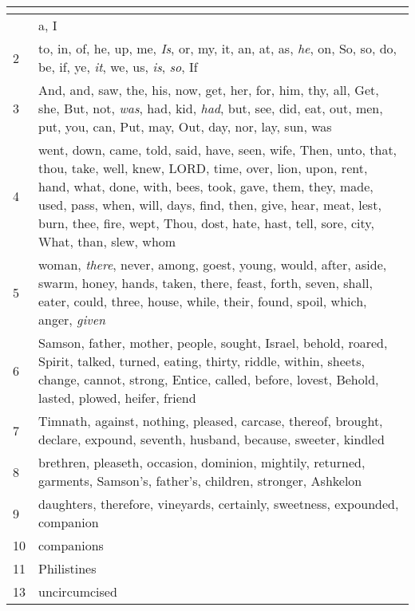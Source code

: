 \begin{center}
\begin{longtable}{l|p{3.75in}}
\hline \multicolumn{2}{c}{{ }} \\ \hline
\endfoot 
1 & a, I\\ \hline 
2 & to, in, of, he, up, me, \emph{Is}, or, my, it, an, at, as, \emph{he}, on, So, so, do, be, if, ye, \emph{it}, we, us, \emph{is}, \emph{so}, If\\ \hline 
3 & And, and, saw, the, his, now, get, her, for, him, thy, all, Get, she, But, not, \emph{was}, had, kid, \emph{had}, but, see, did, eat, out, men, put, you, can, Put, may, Out, day, nor, lay, sun, was\\ \hline 
4 & went, down, came, told, said, have, seen, wife, Then, unto, that, thou, take, well, knew, LORD, time, over, lion, upon, rent, hand, what, done, with, bees, took, gave, them, they, made, used, pass, when, will, days, find, then, give, hear, meat, lest, burn, thee, fire, wept, Thou, dost, hate, hast, tell, sore, city, What, than, slew, whom\\ \hline 
5 & woman, \emph{there}, never, among, goest, young, would, after, aside, swarm, honey, hands, taken, there, feast, forth, seven, shall, eater, could, three, house, while, their, found, spoil, which, anger, \emph{given}\\ \hline 
6 & Samson, father, mother, people, sought, Israel, behold, roared, Spirit, talked, turned, eating, thirty, riddle, within, sheets, change, cannot, strong, Entice, called, before, lovest, Behold, lasted, plowed, heifer, friend\\ \hline 
7 & Timnath, against, nothing, pleased, carcase, thereof, brought, declare, expound, seventh, husband, because, sweeter, kindled\\ \hline 
8 & brethren, pleaseth, occasion, dominion, mightily, returned, garments, Samson's, father's, children, stronger, Ashkelon\\ \hline 
9 & daughters, therefore, vineyards, certainly, sweetness, expounded, companion\\ \hline 
10 & companions\\ \hline 
11 & Philistines\\ \hline 
13 & uncircumcised\\ \hline 
\end{longtable}
\end{center}





